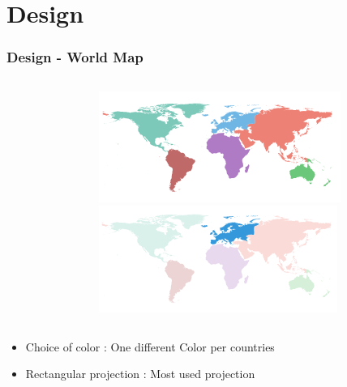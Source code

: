 \documentclass{beamer}
\begin{document}
\section{Design}

\begin{frame}
\frametitle{Design - World Map}

\begin{columns}[T]
  \begin{column}{.7\textwidth}
    \begin{table}
    \end{table}
  \end{column}
  \begin{column}{.25\textwidth}
    \begin{figure}
      \centering
      \includegraphics[scale=0.3]{img/map.png} \\
      \includegraphics[scale=0.3]{img/map_selected.png}
    \end{figure}
  \end{column}
\end{columns}
\begin{itemize}
\item Choice of color : One different Color per countries 
\item Rectangular projection : Most used projection  
\end{itemize}
\end{frame}
\end{document}
